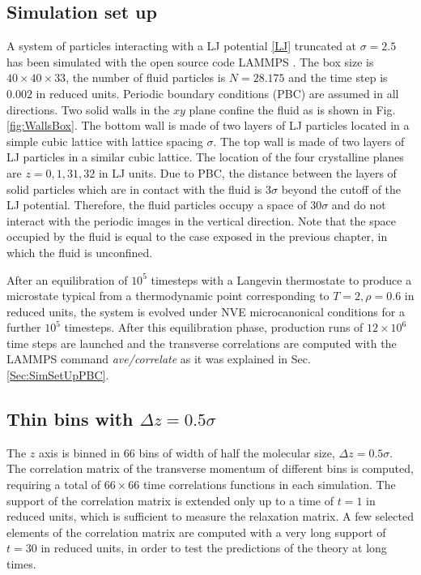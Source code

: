 \documentclass[b5paper,openright,11pt]{book}
\begin{document}
\subsection{Simulation set up}
A system of particles interacting  with a LJ potential \ref{LJ}
truncated at $\sigma=2.5$ has been simulated with the open source code LAMMPS \cite{Plimpton1995}. The
box size  is $40\times40\times33$,  the number  of fluid  particles is
$N=28.175$ and  the time step  is $0.002$ in reduced  units.  Periodic
boundary conditions  (PBC) are assumed  in all directions.   Two solid
walls in the $xy$ plane confine the fluid as is shown in Fig. \ref{fig:WallsBox}.  The bottom wall is made of
two layers  of LJ  particles located  in a  simple cubic  lattice with
lattice spacing  $\sigma$. The top  wall is made  of two layers  of LJ
particles  in a  similar  cubic  lattice.  The  location  of the  four
crystalline planes  are $z=0,1,31,32$  in LJ units.   Due to  PBC, the
distance between  the layers of  solid particles which are  in contact
with   the  fluid   is  $3\sigma$   beyond  the   cutoff  of   the  LJ
potential. Therefore, the fluid particles occupy a space of $30\sigma$
and  do  not  interact  with  the  periodic  images  in  the  vertical
direction. Note that the space occupied by the fluid is equal to the case exposed in the previous chapter, in which the fluid is unconfined. 

After an equilibration of $10^5$ timesteps with a Langevin thermostate
to   produce  a   microstate  typical   from  a   thermodynamic  point
corresponding  to  $T=2,\rho=0.6$ in  reduced  units,  the system  is
evolved  under  NVE microcanonical  conditions  for  a further  $10^5$
timesteps.  After this equilibration  phase, production runs of $12\times 10^6$
time steps are launched and the transverse correlations are computed with the LAMMPS command \textit{ave/correlate} as it was explained in Sec. \ref{Sec:SimSetUpPBC}. 

\subsection{Thin bins with $\Delta z = 0.5\sigma$}
\label{Sec:ThinBins}
The $z$  axis is binned  in $66$ bins of  width of half  the molecular
size, $\Delta z=0.5\sigma$.  The  correlation matrix of the transverse
momentum of different bins is computed, requiring a total of $66\times
66$ time correlations  functions  in each  simulation.   
The support of  the correlation matrix  is extended only  up to a  time of
$t=1$ in reduced units, which  is sufficient to measure the relaxation
matrix.   A  few  selected  elements of  the  correlation  matrix  are
computed with a very long support of $t=30$ in reduced units, in order
to test the predictions of the theory at long times.
\end{document}
